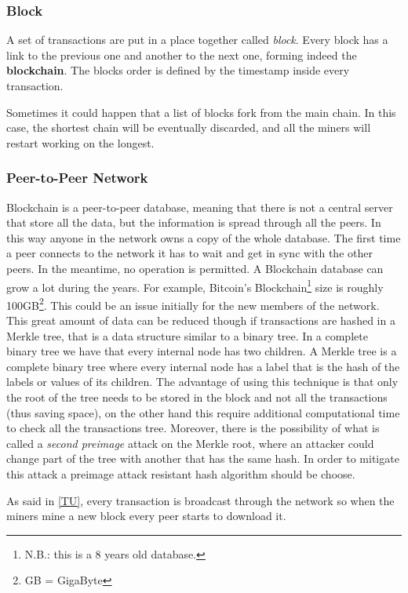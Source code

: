 \subsubsection{Block}
A set of transactions are put in a place together called \textit{block}. Every
block has a link to the previous one and another to the next one, forming
indeed the \textbf{blockchain}.
The blocks order is defined by the timestamp inside every transaction.

\label{fork}
Sometimes it could happen that a list of blocks fork from the main chain. In
this case, the shortest chain will be eventually discarded, and all the miners
will restart working on the longest\cite{sok15}.

\subsubsection{Peer-to-Peer Network}

Blockchain is a peer-to-peer database, meaning that there is not a central
server that store all the data, but the information is spread through all the
peers.
In this way anyone in the network owns a copy of the whole database. The first
time a peer connects to the network it has to wait and get in sync with the
other peers. In the meantime, no operation is permitted. A Blockchain database
can grow a lot during the years. For example, Bitcoin's
Blockchain\footnote{N.B.: this is a 8 years old database.} size is roughly
100GB\footnote{GB = GigaByte}. This could be an issue initially for the new
members of the network.
This great amount of data can be reduced though if transactions are hashed in a
Merkle tree, that is a data structure similar to a binary tree. In a complete
binary tree we have that every internal node has two children. A Merkle tree is
a complete binary tree where every internal node has a label that is the hash
of the labels or values of its children\cite{szydlo04}. The advantage of using
this technique is that only the root of the tree needs to be stored in the
block and not all the transactions\cite{nakamoto08} (thus saving space), on the
other hand this require additional computational time to check all the
transactions tree. Moreover, there is the possibility of what is called a
\textit{second preimage} attack on the Merkle root, where an attacker could
change part of the tree with another that has the same hash\cite{rogaway04}. In
order to mitigate this attack a preimage attack resistant hash algorithm should
be choose.


As said in \ref{TU}, every transaction is broadcast through the network so when
the miners mine a new block every peer starts to download it.

